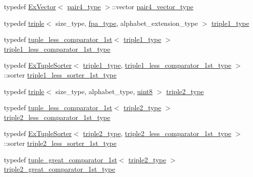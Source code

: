 \begin{DoxyCompactItemize}
\item 
typedef \hyperlink{struct_ex_vector}{Ex\+Vector}$<$ \hyperlink{class_validate4_a8ef701022ecc2f0ffc1eae0e71e0aaf7}{pair4\+\_\+type} $>$\+::vector \hyperlink{class_validate4_a883822e6f1be0d67f71e1feb9729b1dc}{pair4\+\_\+vector\+\_\+type}
\item 
typedef \hyperlink{structtriple}{triple}$<$ size\+\_\+type, \hyperlink{common_8h_a7fdaf8b9b3d2f6ae6b10597a8d3f96ee}{fpa\+\_\+type}, alphabet\+\_\+extension\+\_\+type $>$ \hyperlink{class_validate4_a8dd208bf04e6c5285cdacb9ac9532a67}{triple1\+\_\+type}
\item 
typedef \hyperlink{structtuple__less__comparator__1st}{tuple\+\_\+less\+\_\+comparator\+\_\+1st}$<$ \hyperlink{class_validate4_a8dd208bf04e6c5285cdacb9ac9532a67}{triple1\+\_\+type} $>$ \hyperlink{class_validate4_af07a5152d547f7fba2f93b78660b88ab}{triple1\+\_\+less\+\_\+comparator\+\_\+1st\+\_\+type}
\item 
typedef \hyperlink{struct_ex_tuple_sorter}{Ex\+Tuple\+Sorter}$<$ \hyperlink{class_validate4_a8dd208bf04e6c5285cdacb9ac9532a67}{triple1\+\_\+type}, \hyperlink{class_validate4_af07a5152d547f7fba2f93b78660b88ab}{triple1\+\_\+less\+\_\+comparator\+\_\+1st\+\_\+type} $>$\+::sorter \hyperlink{class_validate4_aa4a137d0ed68e95db5ebbe57544d80ed}{triple1\+\_\+less\+\_\+sorter\+\_\+1st\+\_\+type}
\item 
typedef \hyperlink{structtriple}{triple}$<$ size\+\_\+type, alphabet\+\_\+type, \hyperlink{types_8h_a115946cb5fc5879545e9ccea096a6031}{uint8} $>$ \hyperlink{class_validate4_a1e1065b2bd86208beeec8aea6edd3ddd}{triple2\+\_\+type}
\item 
typedef \hyperlink{structtuple__less__comparator__1st}{tuple\+\_\+less\+\_\+comparator\+\_\+1st}$<$ \hyperlink{class_validate4_a1e1065b2bd86208beeec8aea6edd3ddd}{triple2\+\_\+type} $>$ \hyperlink{class_validate4_a83e9e52347608368b088892cabbdc8c5}{triple2\+\_\+less\+\_\+comparator\+\_\+1st\+\_\+type}
\item 
typedef \hyperlink{struct_ex_tuple_sorter}{Ex\+Tuple\+Sorter}$<$ \hyperlink{class_validate4_a1e1065b2bd86208beeec8aea6edd3ddd}{triple2\+\_\+type}, \hyperlink{class_validate4_a83e9e52347608368b088892cabbdc8c5}{triple2\+\_\+less\+\_\+comparator\+\_\+1st\+\_\+type} $>$\+::sorter \hyperlink{class_validate4_a4c1bcea817e34f96d95c99e0694bbfc8}{triple2\+\_\+less\+\_\+sorter\+\_\+1st\+\_\+type}
\item 
typedef \hyperlink{structtuple__great__comparator__1st}{tuple\+\_\+great\+\_\+comparator\+\_\+1st}$<$ \hyperlink{class_validate4_a1e1065b2bd86208beeec8aea6edd3ddd}{triple2\+\_\+type} $>$ \hyperlink{class_validate4_a17f3f46281d706a75c002eed273aeaf8}{triple2\+\_\+great\+\_\+comparator\+\_\+1st\+\_\+type}

\end{DoxyCompactItemize}
